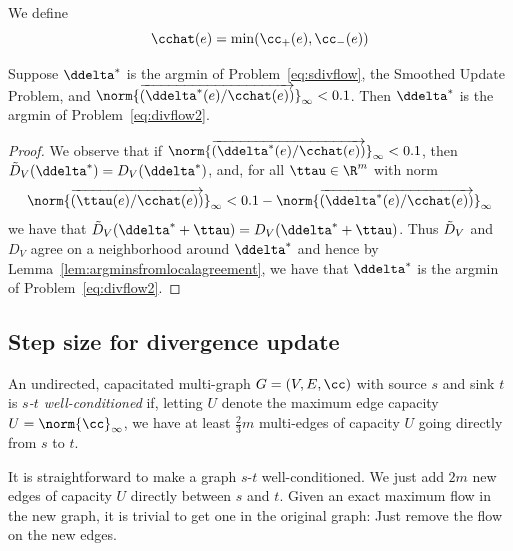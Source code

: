 We define
\begin{equation}
  \label{eq:symrescap}
  \cchat(e) = \min(\cc_+(e) , \cc_-(e) ) 
\end{equation}

\begin{lemma}
  Suppose $\ddelta^*$ is the argmin of
  Problem~\eqref{eq:sdivflow}, the Smoothed Update Problem, and
  $\norm{\cvec{\ddelta^*(e)/\cchat(e)}}_{\infty} < 0.1$.
  Then $\ddelta^*$ is the argmin of Problem~\eqref{eq:divflow2}.
\end{lemma}
\begin{proof}
  We observe that if   $\norm{\cvec{\ddelta^*(e)/\cchat(e)}}_{\infty}
  < 0.1$, then $\sdiv_V( \ddelta^*) = D_V( \ddelta^*)$, and,
  for all $\ttau \in \R^m$ with norm
  \[
    \norm{\cvec{\ttau(e)/\cchat(e)}}_{\infty} < 0.1 -
    \norm{\cvec{\ddelta^*(e)/\cchat(e)}}_{\infty}
  \]
  we have that
  $\sdiv_V( \ddelta^*+\ttau) = D_V( \ddelta^*+\ttau
  )$.
  Thus $\tilde{D}_V$ and $D_V$ agree on a neighborhood around
  $\ddelta^*$ and hence by
  Lemma~\ref{lem:argminsfromlocalagreement}, we have that
  $\ddelta^*$ is the argmin of Problem~\eqref{eq:divflow2}.
\end{proof}

\subsection{Step size for divergence update}

\begin{definition}
   An undirected, capacitated multi-graph $G = (V,E,\cc)$ with source $s$
   and sink $t$ is 
   \emph{$s$-$t$ well-conditioned} if,
   letting $U$ denote the maximum edge capacity $U =
   \norm{\cc}_{\infty}$,
   we have at least $\frac{2}{3} m$ multi-edges of capacity $U$ going directly
   from $s$ to $t$.
 \end{definition}

 \begin{remark}
   It is straightforward to make a graph $s$-$t$ well-conditioned.
   We just add $2m$ new edges of capacity $U$ directly between $s$ and
   $t$.
   Given an exact maximum flow in the new graph, it is trivial to get
   one in the original graph: Just remove the flow on the new edges.
 \end{remark}
 
